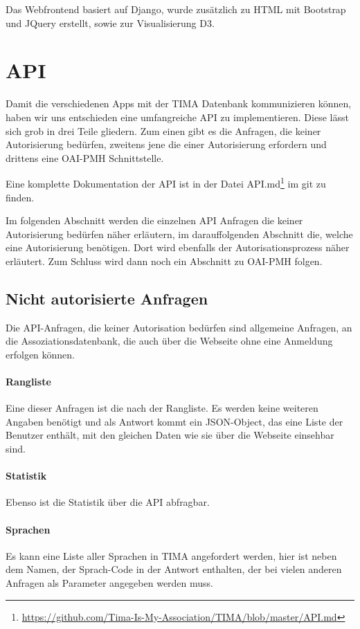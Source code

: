 Das Webfrontend basiert auf Django, wurde zusätzlich zu HTML mit Bootstrap und JQuery erstellt, sowie zur Visualisierung D3.

\section{API}
Damit die verschiedenen Apps mit der TIMA Datenbank kommunizieren können, haben
wir uns entschieden eine umfangreiche API zu implementieren. Diese lässt sich
grob in drei Teile gliedern. Zum einen gibt es die Anfragen, die keiner
Autorisierung bedürfen, zweitens jene die einer Autorisierung erfordern und
drittens eine OAI-PMH Schnittstelle.

Eine komplette Dokumentation der API ist in der Datei API.md\footnote{\url{https://github.com/Tima-Is-My-Association/TIMA/blob/master/API.md}} im git zu finden.

Im folgenden Abschnitt werden die einzelnen API Anfragen die keiner Autorisierung bedürfen näher erläutern, im darauffolgenden Abschnitt die, welche eine Autorisierung benötigen. Dort wird ebenfalls der Autorisationsprozess näher erläutert. Zum Schluss wird dann noch ein Abschnitt zu OAI-PMH folgen.

\subsection{Nicht autorisierte Anfragen}
Die API-Anfragen, die keiner Autorisation bedürfen sind allgemeine Anfragen, an die Assoziationsdatenbank, die auch über die Webseite ohne eine Anmeldung erfolgen können.

\paragraph{Rangliste} Eine dieser Anfragen ist die nach der Rangliste. Es werden keine weiteren Angaben benötigt und als Antwort kommt ein JSON-Object, das eine Liste der Benutzer enthält, mit den gleichen Daten wie sie über die Webseite einsehbar sind.

\paragraph{Statistik} Ebenso ist die Statistik über die API abfragbar.

\paragraph{Sprachen} Es kann eine Liste aller Sprachen in TIMA angefordert werden, hier ist neben dem Namen, der Sprach-Code in der Antwort enthalten, der bei vielen anderen Anfragen als Parameter angegeben werden muss.

